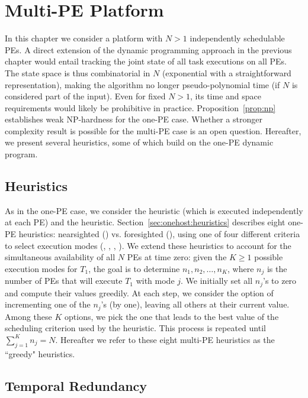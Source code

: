 \chapter{Multi-PE Platform}
\label{sec:multihost}


In this chapter we consider a platform with $N{>}1$ independently
schedulable PEs.  A direct extension of the dynamic programming approach in
the previous chapter would entail tracking the joint state of all task
executions on all PEs. The state space is thus combinatorial in $N$
(exponential with a straightforward representation), making the algorithm
no longer pseudo-polynomial time (if $N$ is considered part of the input).
Even for fixed $N{>}1$, its time and space requirements would likely be
prohibitive in practice.  Proposition~\ref{prop:np} establishes weak
NP-hardness for the one-PE case. Whether a stronger complexity result is
possible for the multi-PE case is an open question. Hereafter, we
present several heuristics, some of which build on the one-PE dynamic program.

\section{Heuristics}
\label{sec:multi-host:heuristics}

As in the one-PE case, we consider the
\dynamic heuristic (which is executed independently at each PE) and the
\random heuristic.  Section~\ref{sec:onehost:heuristics} describes eight
one-PE heuristics: nearsighted (\nearsighted) vs.  foresighted
(\foresighted), using one of four different criteria to select execution
modes (\errorlevel, \probsuccess, \ratio, \expectederror).  We extend these
heuristics to account for the simultaneous availability of all $N$ PEs at
time zero: given the $K{\geq}1$ possible execution modes for $T_1$, the
goal is to determine $n_1, n_2, \ldots, n_K$, where $n_j$ is the number of
PEs that will execute $T_1$ with mode $j$.  We initially set all $n_j$'s to
zero and compute their values greedily.  At each step, we
consider the option of incrementing one of the $n_j$'s (by one), leaving
all others at their current value.  Among these $K$ options, we pick the
one that leads to the best value of the scheduling criterion used by the
heuristic. This process is repeated until $\sum_{j=1}^{K} n_j = N$.
Hereafter we refer to these eight multi-PE heuristics as the ``greedy"
heuristics.

\section{Temporal Redundancy}


